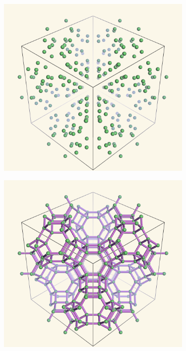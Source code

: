 \documentclass{beamer}
\begin{document}
\begin{frame}
  \begin{center}
    \includegraphics[height=3.5in]{fau-atoms-new}
  \end{center}
\end{frame}

\begin{frame}
  \begin{center}
    \includegraphics[height=3.5in]{fau-net-new}
  \end{center}
\end{frame}
\end{document}
